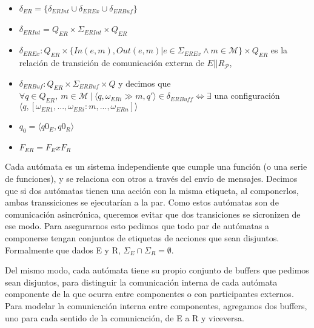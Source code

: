 \begin{definition}[Composición]
\begin{itemize}
\item $\delta_{ER} = \{ \delta_{ER \mathit{Int}} \cup \delta_{ER\mathit{Ex}} \cup \delta_{ER\mathit{Buf}}\}$
\item $\delta_{ER\mathit{Int}} = Q_{ER} \times \Sigma_{ER\mathit{Int}} \times Q_{ER} $
\item $\delta_{ER\mathit{Ex}}: Q_{ER} \times \{\mathit{In}(e,m), \mathit{Out}(e,m) | e \in \Sigma_{ER\mathit{Ex}} \land m \in \mathcal{M}\} \times Q_{ER}$ es la relación de transición de comunicación externa de $E||R_\mathcal{P}$,
\item $\delta_{ER\mathit{Buf}}: Q_{ER} \times \Sigma_{ER\mathit{Buf}} \times Q$ y decimos que $\forall q \in Q_\mathit{ER}, \ m \in \mathcal{M} \ |	 \ \langle q, \omega_\mathit{ERi} \gg m, q' \rangle \in \delta_\mathit{ERBuff} \iff \exists$ una configuración $ \langle q, [\omega_\mathit{ER1},...,\omega_\mathit{ERi}:m, ..., \omega_\mathit{ERn}] \rangle$ 

\item $q_0 = \langle q0_E,q0_R \rangle$
\item $F_{ER} = F_E x F_R$

\end{itemize}

Cada autómata es un sistema independiente que cumple una función (o una serie de funciones), y se relaciona con otros a través del envío de mensajes. Decimos que si dos autómatas tienen una acción con la misma etiqueta, al componerlos, ambas transsiciones se ejecutarían a la par. Como estos autómatas son de comunicación asincrónica, queremos evitar que dos transiciones se sicronizen de ese modo. Para asegurarnos esto pedimos que todo par de autómatas a componerse tengan conjuntos de etiquetas de acciones que sean disjuntos. Formalmente que dados E y R, $\Sigma_E \cap \Sigma_R = \emptyset$. 

Del mismo modo, cada autómata tiene su propio conjunto de buffers que pedimos sean disjuntos, para distinguir la comunicación interna de cada autómata componente de la que ocurra entre componentes o con participantes externos. Para modelar la comunicación interna entre componentes, agregamos dos buffers, uno para cada sentido de la comunicación, de E a R y viceversa.


\end{definition}
